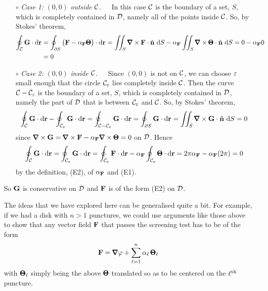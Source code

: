 \begin{itemize}
\item[$\circ$] \emph{Case 1: $(0,0)$ outside $\mathcal{C}$.}\ \ \ 
In this case $\mathcal{C}$ is the boundary of a set, $S$, which is completely 
contained in $\mathcal{D}$, namely all of the points inside $\mathcal{C}$.  
So, by Stokes' theorem,
\begin{align*}
\oint_{\cC}\vG\cdot \dee{\vr}
&=\oint_{\partial S}\big(\vF-\alpha_\vF\vTh\big)\cdot \dee{\vr}
=\dblInt_S \vnabla\times\vF\cdot\hn\ \dee{S}
-\alpha_\vF\dblInt_S \vnabla\times\vTh\cdot\hn\ \dee{S}
=0-\alpha_\vF 0 \\
&=0
\end{align*}

\item[$\circ$] {\it Case 2: $(0,0)$ inside $\mathcal{C}$.}\ \ \ 
 Since $(0,0)$ is not on $\mathcal{C}$, we can choose $\varepsilon$
small enough that the circle $\mathcal{C}_\varepsilon$ lies completely inside
$\mathcal{C}$. Then the curve $\mathcal{C}-\mathcal{C}_\varepsilon$ is the boundary of a set,
$S$, which is completely contained in $\mathcal{D}$, namely the part of $\mathcal{D}$ that
is between $\mathcal{C}_\varepsilon$ and $\mathcal{C}$.  So, by Stokes' theorem,
\begin{equation*}
\oint_{\cC}\vG\cdot \dee{\vr}
        -\oint_{\cC_\veps}\vG\cdot \dee{\vr}
=\oint_{\cC-\cC_\veps}\vG\cdot \dee{\vr}
=\oint_{\partial S}\vG\cdot \dee{\vr}
=\dblInt_S \vnabla\times\vG\cdot\hn\ \dee{S}
=0
\end{equation*}
since $\vnabla\times\vG=\vnabla\times\vF-\alpha_\vF\vnabla\times\vTh=0$ on
$\mathcal{D}$. Hence
\begin{equation*}
\oint_{\mathcal{C}}\mathbf{G}\cdot \mathrm{d}\mathbf{r}
=\oint_{\mathcal{C}_\varepsilon}\mathbf{G}\cdot \mathrm{d}\mathbf{r}
=\oint_{\mathcal{C}_\varepsilon}\mathbf{F}\cdot \mathrm{d}\mathbf{r}
     -\alpha_{\mathbf{F}} \oint_{\mathcal{C}_\varepsilon}{\pmb{\Theta}}\cdot \mathrm{d}\mathbf{r}
=2\pi\alpha_{\mathbf{F}} -\alpha_{\mathbf{F}}(2\pi)=0
\end{equation*}
by the definition, (E2), of $\alpha_{\mathbf{F}}$ and (E1).
\end{itemize}
So $\mathbf{G}$ is conservative on $\mathcal{D}$ and $\mathbf{F}$ is of the form 
(E2) on $\mathcal{D}$.

The ideas that we have explored here can be generalised quite a bit.
For example, if we had a disk with $n>1$ punctures, we could use
arguments like those above to show that any vector field $\mathbf{F}$ that passes
the screening test has to be of the form
\begin{equation*}
\vF=\vnabla\varphi + \sum_{\ell=1}^n \alpha_\ell\,\vTh_\ell
\end{equation*}
with ${\pmb{\Theta}}_\ell$ simply being the above ${\pmb{\Theta}}$ translated so as to be
centered on the $\ell^{\rm th}$ puncture.




